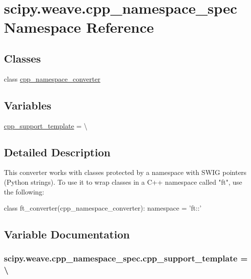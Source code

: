 \hypertarget{namespacescipy_1_1weave_1_1cpp__namespace__spec}{}\section{scipy.\+weave.\+cpp\+\_\+namespace\+\_\+spec Namespace Reference}
\label{namespacescipy_1_1weave_1_1cpp__namespace__spec}
\subsection*{Classes}
\begin{DoxyCompactItemize}
\item 
class \hyperlink{classscipy_1_1weave_1_1cpp__namespace__spec_1_1cpp__namespace__converter}{cpp\+\_\+namespace\+\_\+converter}
\end{DoxyCompactItemize}
\subsection*{Variables}
\begin{DoxyCompactItemize}
\item 
\hyperlink{namespacescipy_1_1weave_1_1cpp__namespace__spec_a6a2d7d11b384cd1557e6fa0f2b3a0784}{cpp\+\_\+support\+\_\+template} = \textbackslash{}
\end{DoxyCompactItemize}


\subsection{Detailed Description}
\begin{DoxyVerb}This converter works with classes protected by a namespace with
SWIG pointers (Python strings).  To use it to wrap classes in
a C++ namespace called "ft", use the following:

class ft_converter(cpp_namespace_converter):
    namespace = 'ft::'
\end{DoxyVerb}
 

\subsection{Variable Documentation}
\hypertarget{namespacescipy_1_1weave_1_1cpp__namespace__spec_a6a2d7d11b384cd1557e6fa0f2b3a0784}{}
\subsubsection[{cpp\+\_\+support\+\_\+template}]{\setlength{\rightskip}{0pt plus 5cm}scipy.\+weave.\+cpp\+\_\+namespace\+\_\+spec.\+cpp\+\_\+support\+\_\+template = \textbackslash{}}\label{namespacescipy_1_1weave_1_1cpp__namespace__spec_a6a2d7d11b384cd1557e6fa0f2b3a0784}
